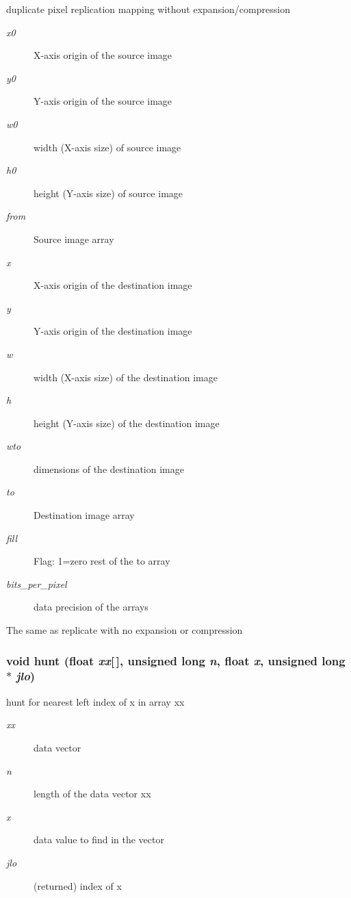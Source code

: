 duplicate pixel replication mapping without expansion/compression 

\begin{Desc}
\item[Parameters:]
\begin{description}
\item[{\em x0}]X-axis origin of the source image \item[{\em y0}]Y-axis origin of the source image \item[{\em w0}]width (X-axis size) of source image \item[{\em h0}]height (Y-axis size) of source image \item[{\em from}]Source image array \item[{\em x}]X-axis origin of the destination image \item[{\em y}]Y-axis origin of the destination image \item[{\em w}]width (X-axis size) of the destination image \item[{\em h}]height (Y-axis size) of the destination image \item[{\em wto}]dimensions of the destination image \item[{\em to}]Destination image array \item[{\em fill}]Flag: 1=zero rest of the to array \item[{\em bits\_\-per\_\-pixel}]data precision of the arrays\end{description}
\end{Desc}
The same as replicate with no expansion or compression 
\subsubsection{\setlength{\rightskip}{0pt plus 5cm}void hunt (float {\em xx}[$\,$], unsigned long {\em n}, float {\em x}, unsigned long $\ast$ {\em jlo})}\label{xtv_8h_a125}


hunt for nearest left index of x in array xx 

\begin{Desc}
\item[Parameters:]
\begin{description}
\item[{\em xx}]data vector \item[{\em n}]length of the data vector xx \item[{\em x}]data value to find in the vector \item[{\em jlo}](returned) index of x \end{description}
\end{Desc}
